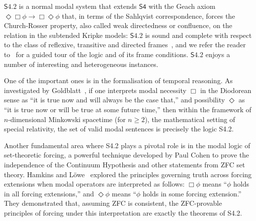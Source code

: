 \documentclass{article}
\newcommand{\logic}{\mathsf{S4.2}}
\newcommand{\axname}[1]{\mathsf{#1}}
\theoremstyle{definition}
\begin{document}
$\logic$ is a normal modal system that extends $\axname{S4}$ with the Geach axiom $\Diamond\Box\phi \rightarrow \Box\Diamond\phi$ that, in terms of the Sahlqvist correspondence, forces the Church-Rosser property, also called weak directedness or confluence, on the relation in the subtended Kripke models: $\logic$ is sound and complete with respect to the class of reflexive, transitive and directed frames~\cite{Segerberg1971:EssayClassicalModal}, and we refer the reader to~\cite{Chalki2018:S42Tour} for a guided tour of the logic and of its frame conditions. $\logic$ enjoys a number of interesting and heterogeneous instances.

One of the important ones is in the formalisation of temporal reasoning. As investigated by Goldblatt~\cite{Goldblatt1980:Diodorean}, if one interprets modal necessity $\Box$ in the Diodorean sense as ``it is true now and will always be the case that,'' and possibility $\Diamond$ as ``it is true now or will be true at some future time,'' then within the framework of $n$-dimensional Minkowski spacetime (for $n \geq 2$), the mathematical setting of special relativity, the set of valid modal sentences is precisely the logic S4.2. %

Another fundamental area where S4.2 plays a pivotal role is in the modal logic of set-theoretic forcing, a powerful technique developed by Paul Cohen to prove the independence of the Continuum Hypothesis and other statements from ZFC set theory. Hamkins and L\"owe~\cite{Hamkins2008:ModalForcing} explored the principles governing truth across forcing extensions when modal operators are interpreted as follows: $\Box\phi$ means ``$\phi$ holds in all forcing extensions,'' and $\Diamond\phi$ means ``$\phi$ holds in some forcing extension.'' They demonstrated that, assuming ZFC is consistent, the ZFC-provable principles of forcing under this interpretation are exactly the theorems of S4.2. %
\end{document}
